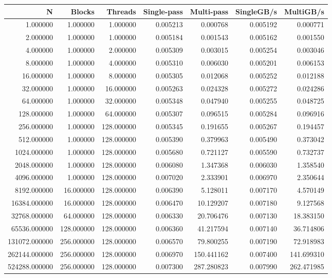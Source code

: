 \begin{tabular}{rrrrrrr}
\toprule
N & Blocks & Threads & Single-pass & Multi-pass & SingleGB/s & MultiGB/s \\
\midrule
1.000000 & 1.000000 & 1.000000 & 0.005213 & 0.000768 & 0.005192 & 0.000771 \\
2.000000 & 1.000000 & 1.000000 & 0.005184 & 0.001543 & 0.005162 & 0.001550 \\
4.000000 & 1.000000 & 2.000000 & 0.005309 & 0.003015 & 0.005254 & 0.003046 \\
8.000000 & 1.000000 & 4.000000 & 0.005310 & 0.006030 & 0.005201 & 0.006153 \\
16.000000 & 1.000000 & 8.000000 & 0.005305 & 0.012068 & 0.005252 & 0.012188 \\
32.000000 & 1.000000 & 16.000000 & 0.005263 & 0.024328 & 0.005272 & 0.024286 \\
64.000000 & 1.000000 & 32.000000 & 0.005348 & 0.047940 & 0.005255 & 0.048725 \\
128.000000 & 1.000000 & 64.000000 & 0.005307 & 0.096515 & 0.005284 & 0.096916 \\
256.000000 & 1.000000 & 128.000000 & 0.005345 & 0.191655 & 0.005267 & 0.194457 \\
512.000000 & 1.000000 & 128.000000 & 0.005390 & 0.379963 & 0.005490 & 0.373042 \\
1024.000000 & 1.000000 & 128.000000 & 0.005680 & 0.721127 & 0.005590 & 0.732737 \\
2048.000000 & 1.000000 & 128.000000 & 0.006080 & 1.347368 & 0.006030 & 1.358540 \\
4096.000000 & 1.000000 & 128.000000 & 0.007020 & 2.333901 & 0.006970 & 2.350644 \\
8192.000000 & 16.000000 & 128.000000 & 0.006390 & 5.128011 & 0.007170 & 4.570149 \\
16384.000000 & 16.000000 & 128.000000 & 0.006470 & 10.129207 & 0.007180 & 9.127568 \\
32768.000000 & 64.000000 & 128.000000 & 0.006330 & 20.706476 & 0.007130 & 18.383150 \\
65536.000000 & 128.000000 & 128.000000 & 0.006360 & 41.217594 & 0.007140 & 36.714806 \\
131072.000000 & 256.000000 & 128.000000 & 0.006570 & 79.800255 & 0.007190 & 72.918983 \\
262144.000000 & 256.000000 & 128.000000 & 0.006970 & 150.441162 & 0.007400 & 141.699310 \\
524288.000000 & 256.000000 & 128.000000 & 0.007300 & 287.280823 & 0.007990 & 262.471985 \\

\end{tabular}
